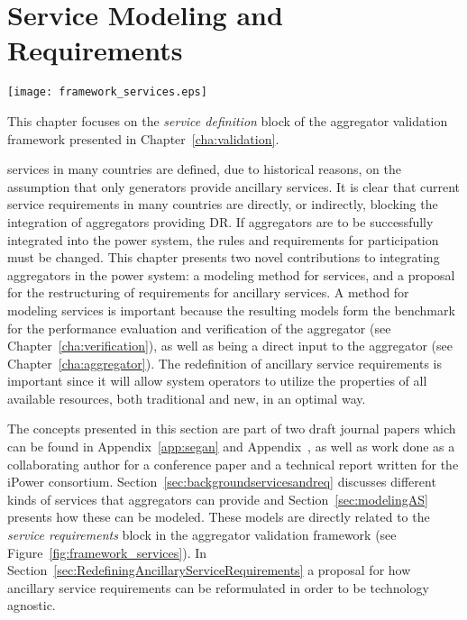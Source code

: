 \chapter{Service Modeling and Requirements} %
\label{cha:services}
\begin{marginfigure}
	\texttt{[image: framework\_services.eps]}
	\caption{This chapter focuses on the \emph{service definition} block of the aggregator validation framework presented in Chapter~\ref{cha:validation}.}
      \label{fig:framework_services}
\end{marginfigure}

 services in many countries are defined, due to historical reasons, on the assumption that only generators provide ancillary services. It is clear that current service requirements in many countries are directly, or indirectly, blocking the integration of aggregators providing DR. If aggregators are to be successfully integrated into the power system, the rules and requirements for participation must be changed. This chapter presents two novel contributions to integrating aggregators in the power system: a modeling method for services, and a proposal for the restructuring of requirements for ancillary services. A method for modeling services is important because the resulting models form the benchmark for the performance evaluation and verification of the aggregator (see Chapter~\ref{cha:verification}), as well as being a direct input to the aggregator (see Chapter~\ref{cha:aggregator}). The redefinition of ancillary service requirements is important since it will allow system operators to utilize the properties of all available resources, both traditional and new, in an optimal way. 

The concepts presented in this section are part of two draft journal papers which can be found in Appendix~\ref{app:segan} and Appendix~, as well as work done as a collaborating author for a conference paper and a technical report written for the iPower consortium. Section~\ref{sec:backgroundservicesandreq} discusses different kinds of services that aggregators can provide and Section~\ref{sec:modelingAS} presents how these can be modeled. These models are directly related to the \emph{service requirements} block in the aggregator validation framework (see Figure~\ref{fig:framework_services}). In Section~\ref{sec:RedefiningAncillaryServiceRequirements} a proposal for how ancillary service requirements can be reformulated in order to be technology agnostic. 

